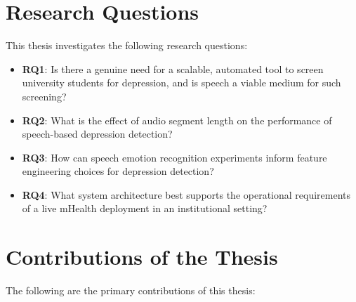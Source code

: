\section{Research Questions}

This thesis investigates the following research questions:

\begin{itemize}
    \item \textbf{RQ1}: Is there a genuine need for a scalable, automated tool to screen university students for depression, and is speech a viable medium for such screening?
    \item \textbf{RQ2}: What is the effect of audio segment length on the performance of speech-based depression detection?
    \item \textbf{RQ3}: How can speech emotion recognition experiments inform feature engineering choices for depression detection?
    \item \textbf{RQ4}: What system architecture best supports the operational requirements of a live mHealth deployment in an institutional setting?
\end{itemize}

\section{Contributions of the Thesis}

The following are the primary contributions of this thesis:

